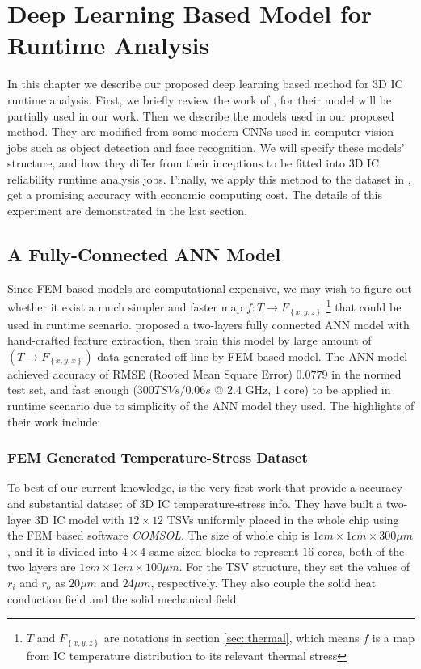 
\chapter{Deep Learning Based Model for Runtime Analysis}
In this chapter we describe our proposed deep learning based method for 3D IC runtime analysis.
First, we briefly review the work of \cite{Zhang2016Fast}, for their model
will be partially used in our work.
Then we describe the models used in our proposed method. They are modified from some modern
CNNs used in computer vision jobs such as object detection and face recognition.
We will specify these models' structure, and how they differ from their inceptions
to be fitted into 3D IC reliability runtime analysis jobs.
Finally, we apply this method to the dataset in \cite{Zhang2016Fast},
get a promising accuracy with economic computing cost.
The details of this experiment are demonstrated in the last section.

\section{A Fully-Connected ANN Model}
Since FEM based models are computational expensive, we may wish to figure out whether
it exist a much simpler and faster map $f: T \to F_{\left\{ x,y,z \right\}}$
\footnote{$T$ and $F_{\left\{ x,y,z \right\}}$ are notations in section \ref{sec::thermal}, which means
$f$ is a map from IC temperature distribution to its relevant thermal stress}
that could be used in runtime scenario.
\cite{Zhang2016Fast} proposed a two-layers fully connected ANN model with hand-crafted
feature extraction, then train this model by large amount of $(T \to F_{\left\{x,y,x\right\}})$ data
generated off-line by FEM based model. 
The ANN model achieved accuracy of RMSE (Rooted Mean Square Error) $0.0779$
in the normed test set, and fast enough 
($300 TSVs / 0.06s$ @ 2.4 GHz, 1 core) to be applied
in runtime scenario due to simplicity of the ANN model they used.
The highlights of their work include:

\subsection{FEM Generated Temperature-Stress Dataset} \label{sec::FEM-data}
To best of our current knowledge, \cite{Zhang2016Fast} is the very first work that provide a
accuracy and substantial dataset of 3D IC temperature-stress info.
They have built a two-layer 3D IC model with $12\times12$ TSVs uniformly placed
in the whole chip using the FEM based software \textit{COMSOL}.
The size of whole chip is $1cm\times1cm\times300\mu m$, and it is
divided into $4\times4$ same sized blocks to represent $16$ cores,
both of the two layers are $1cm\times1cm\times100\mu m$. 
For the TSV structure, they set the values of $r_i$ and $r_o$
as $20\mu m$ and $24\mu m$, respectively. They also couple
the solid heat conduction field and the solid mechanical field.

